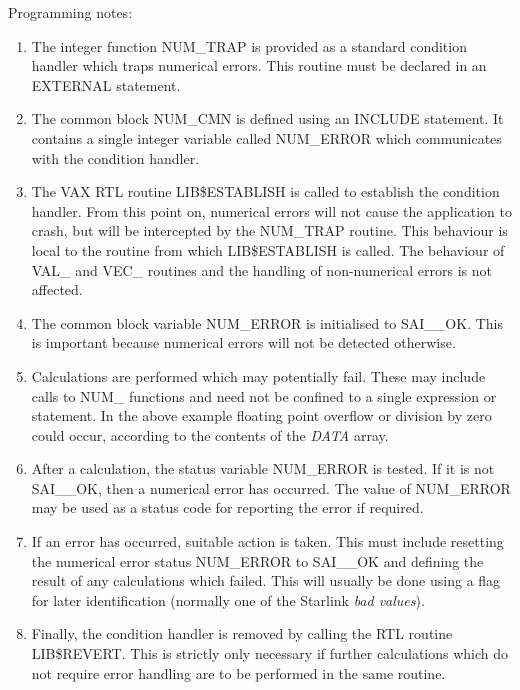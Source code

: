 \documentclass[11pt,nolof]{starlink}
\providecommand{\name}[1]{\mbox{#1}}
\providecommand{\fortvar}[1]{\mbox{\emph{#1}}}
\begin{document}
Programming notes:

\begin{enumerate}

\item The integer function \name{NUM\_TRAP} is provided as a standard
condition handler which traps numerical errors.
This routine must be declared in an EXTERNAL statement.

\item The common block \name{NUM\_CMN} is defined using an \name{INCLUDE}
statement.
It contains a single integer variable called \name{NUM\_ERROR} which
communicates with the condition handler.

\item The \name{VAX} \name{RTL} routine \name{LIB\$ESTABLISH} is called to
establish the condition handler.
From this point on, numerical errors will not cause the application to
crash, but will be intercepted by the \name{NUM\_TRAP} routine.
This behaviour is local to the routine from which \name{LIB\$ESTABLISH} is
called.
The behaviour of \name{VAL\_} and \name{VEC\_} routines and the handling of
non-numerical errors is not affected.

\item The common block variable \name{NUM\_ERROR} is initialised to
\name{SAI\_\_OK}.
This is important because numerical errors will not be detected otherwise.

\item Calculations are performed which may potentially fail.  These may
include calls to \name{NUM\_} functions and need not be confined to a single
expression or statement.
In the above example floating point overflow or division by zero could
occur, according to the contents of the \fortvar{DATA} array.

\item  After a calculation, the status variable \name{NUM\_ERROR} is tested.
If it is not \name{SAI\_\_OK}, then a numerical error has occurred.
The value of \name{NUM\_ERROR} may be used as a status code for reporting
the error if required.

\item  If an error has occurred, suitable action is taken.
This must include resetting the numerical error status \name{NUM\_ERROR} to
\name{SAI\_\_OK} and defining the result of any calculations which failed.
This will usually be done using a flag for later identification (normally
one of the Starlink \emph{bad values}).

\item Finally, the condition handler is removed by calling the \name{RTL}
routine \name{LIB\$REVERT}.  This is strictly only necessary if further
calculations which do not require error handling are to be performed in the
same routine.

\end{enumerate}
\end{document}
